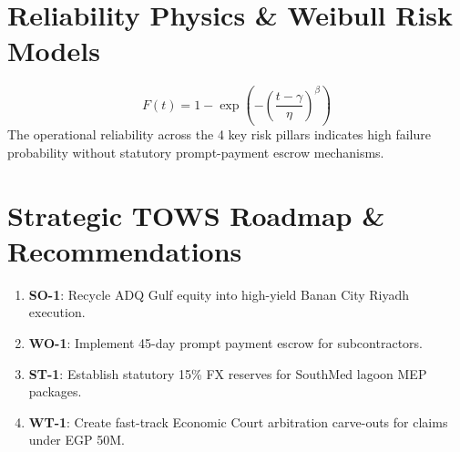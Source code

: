 \documentclass[11pt,a4paper]{report}
\begin{document}
\chapter{Reliability Physics \& Weibull Risk Models}
\begin{equation}
F(t) = 1 - \exp\left( -\left( \frac{t - \gamma}{\eta} \right)^\beta \right)
\end{equation}
The operational reliability across the 4 key risk pillars indicates high failure probability without statutory prompt-payment escrow mechanisms.

\chapter{Strategic TOWS Roadmap \& Recommendations}
\begin{enumerate}
    \item \textbf{SO-1}: Recycle ADQ Gulf equity into high-yield Banan City Riyadh execution.
    \item \textbf{WO-1}: Implement 45-day prompt payment escrow for subcontractors.
    \item \textbf{ST-1}: Establish statutory 15\% FX reserves for SouthMed lagoon MEP packages.
    \item \textbf{WT-1}: Create fast-track Economic Court arbitration carve-outs for claims under EGP 50M.
\end{enumerate}
\end{document}
